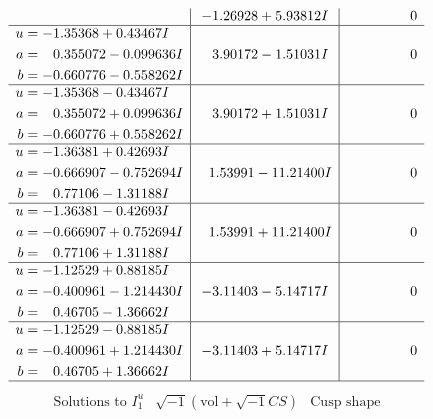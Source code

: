 \documentclass[1p]{elsarticle_modified}
\theoremstyle{definition}
\newcommand{\I}{\sqrt{-1}}
\begin{document}
$$\begin{array}{c|c|c}
 & -1.26928 + 5.93812 I & \phantom{-0.000000 } 0 \\ \hline\begin{aligned}
u &= -1.35368 + 0.43467 I \\
a &= \phantom{-}0.355072 - 0.099636 I \\
b &= -0.660776 - 0.558262 I\end{aligned}
 & \phantom{-}3.90172 - 1.51031 I & \phantom{-0.000000 } 0 \\ \hline\begin{aligned}
u &= -1.35368 - 0.43467 I \\
a &= \phantom{-}0.355072 + 0.099636 I \\
b &= -0.660776 + 0.558262 I\end{aligned}
 & \phantom{-}3.90172 + 1.51031 I & \phantom{-0.000000 } 0 \\ \hline\begin{aligned}
u &= -1.36381 + 0.42693 I \\
a &= -0.666907 - 0.752694 I \\
b &= \phantom{-}0.77106 - 1.31188 I\end{aligned}
 & \phantom{-}1.53991 - 11.21400 I & \phantom{-0.000000 } 0 \\ \hline\begin{aligned}
u &= -1.36381 - 0.42693 I \\
a &= -0.666907 + 0.752694 I \\
b &= \phantom{-}0.77106 + 1.31188 I\end{aligned}
 & \phantom{-}1.53991 + 11.21400 I & \phantom{-0.000000 } 0 \\ \hline\begin{aligned}
u &= -1.12529 + 0.88185 I \\
a &= -0.400961 - 1.214430 I \\
b &= \phantom{-}0.46705 - 1.36662 I\end{aligned}
 & -3.11403 - 5.14717 I & \phantom{-0.000000 } 0 \\ \hline\begin{aligned}
u &= -1.12529 - 0.88185 I \\
a &= -0.400961 + 1.214430 I \\
b &= \phantom{-}0.46705 + 1.36662 I\end{aligned}
 & -3.11403 + 5.14717 I & \phantom{-0.000000 } 0\\
 \hline 
 \end{array}$$\newpage$$\begin{array}{c|c|c}  
\text{Solutions to }I^u_{1}& \I (\text{vol} + \sqrt{-1}CS) & \text{Cusp shape}\\

\end{array}$$
\end{document}
